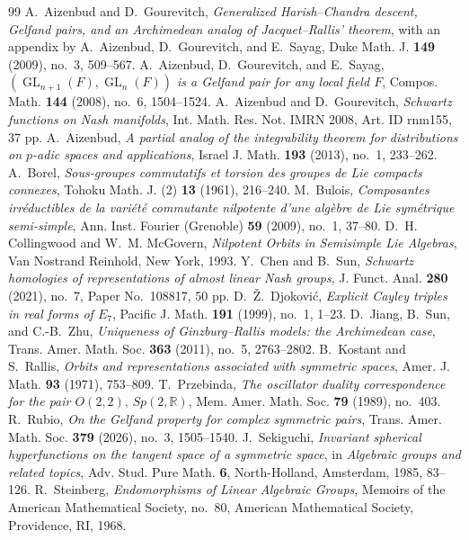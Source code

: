 \documentclass[10pt,a4paper]{amsart}
\numberwithin{equation}{section}
\newcommand{\R}{\mathbb R}
\newcommand{\GL}{\operatorname{GL}}
\begin{document}
\begin{thebibliography}{99}
 A.~Aizenbud and D.~Gourevitch, \emph{Generalized Harish--Chandra descent, Gelfand pairs, and an Archimedean analog of Jacquet--Rallis' theorem}, with an appendix by A.~Aizenbud, D.~Gourevitch, and E.~Sayag, Duke Math. J. \textbf{149} (2009), no.~3, 509--567.
 A.~Aizenbud, D.~Gourevitch, and E.~Sayag, \emph{$(\GL_{n+1}(F),\GL_n(F))$ is a Gelfand pair for any local field $F$}, Compos. Math. \textbf{144} (2008), no.~6, 1504--1524.
 A.~Aizenbud and D.~Gourevitch, \emph{Schwartz functions on Nash manifolds}, Int. Math. Res. Not. IMRN 2008, Art. ID rnm155, 37 pp.
 A.~Aizenbud, \emph{A partial analog of the integrability theorem for distributions on $p$-adic spaces and applications}, Israel J. Math. \textbf{193} (2013), no.~1, 233--262.
 A.~Borel, \emph{Sous-groupes commutatifs et torsion des groupes de Lie compacts connexes}, Tohoku Math. J. (2) \textbf{13} (1961), 216--240.
 M.~Bulois, \emph{Composantes irr\'eductibles de la vari\'et\'e commutante nilpotente d'une alg\`ebre de Lie sym\'etrique semi-simple}, Ann. Inst. Fourier (Grenoble) \textbf{59} (2009), no.~1, 37--80.
 D.~H. Collingwood and W.~M. McGovern, \emph{Nilpotent Orbits in Semisimple Lie Algebras}, Van Nostrand Reinhold, New York, 1993.
 Y.~Chen and B.~Sun, \emph{Schwartz homologies of representations of almost linear Nash groups}, J. Funct. Anal. \textbf{280} (2021), no.~7, Paper No.~108817, 50 pp.
 D.~\v{Z}.~Djokovi\'c, \emph{Explicit Cayley triples in real forms of $E_7$}, Pacific J. Math. \textbf{191} (1999), no.~1, 1--23.
 D.~Jiang, B.~Sun, and C.-B.~Zhu, \emph{Uniqueness of Ginzburg--Rallis models: the Archimedean case}, Trans. Amer. Math. Soc. \textbf{363} (2011), no.~5, 2763--2802.
 B.~Kostant and S.~Rallis, \emph{Orbits and representations associated with symmetric spaces}, Amer. J. Math. \textbf{93} (1971), 753--809.
 T.~Przebinda, \emph{The oscillator duality correspondence for the pair $O(2,2),\,Sp(2,\R)$}, Mem. Amer. Math. Soc. \textbf{79} (1989), no.~403.
 R.~Rubio, \emph{On the Gelfand property for complex symmetric pairs}, Trans. Amer. Math. Soc. \textbf{379} (2026), no.~3, 1505--1540.
 J.~Sekiguchi, \emph{Invariant spherical hyperfunctions on the tangent space of a symmetric space}, in \emph{Algebraic groups and related topics}, Adv. Stud. Pure Math. \textbf{6}, North-Holland, Amsterdam, 1985, 83--126.
 R.~Steinberg, \emph{Endomorphisms of Linear Algebraic Groups}, Memoirs of the American Mathematical Society, no.~80, American Mathematical Society, Providence, RI, 1968.
\end{thebibliography}
\end{document}

